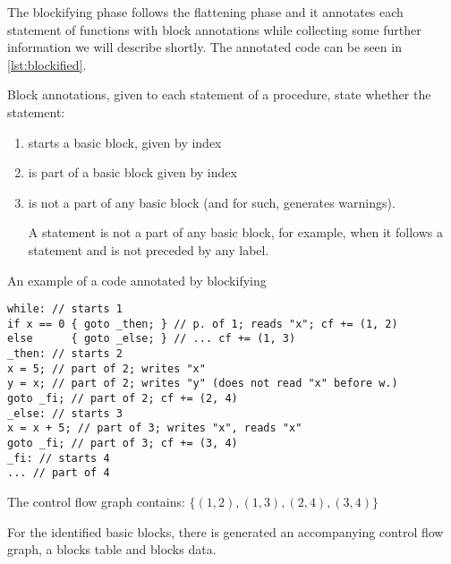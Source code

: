 The blockifying phase follows the flattening phase and it annotates each statement of functions with block annotations while collecting some further information we will describe shortly. The annotated code can be seen in \cref{lst:blockified}.

\begin{defn}
    Block annotations, given to each statement of a procedure, state whether the statement:

    \begin{enumerate}
        \item starts a basic block, given by index
        \item is part of a basic block given by index
        \item is not a part of any basic block (and for such, generates warnings).

        A statement is not a part of any basic block, for example, when it follows a  statement and is not preceded by any label.
    \end{enumerate}
\end{defn}

\begin{listing}
    \caption{An example of a code annotated by blockifying}
    \label{lst:blockified}
    \begin{lstlisting}
while: // starts 1
if x == 0 { goto _then; } // p. of 1; reads "x"; cf += (1, 2)
else      { goto _else; } // ... cf += (1, 3)
_then: // starts 2
x = 5; // part of 2; writes "x"
y = x; // part of 2; writes "y" (does not read "x" before w.)
goto _fi; // part of 2; cf += (2, 4)
_else: // starts 3
x = x + 5; // part of 3; writes "x", reads "x"
goto _fi; // part of 3; cf += (3, 4)
_fi: // starts 4
... // part of 4
    \end{lstlisting}

    The control flow graph contains: $\{(1,2), (1,3), (2,4), (3,4)\}$
\end{listing}

For the identified basic blocks, there is generated an accompanying control flow graph, a blocks table and blocks data.

